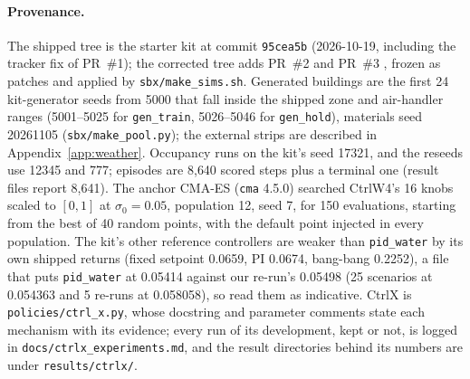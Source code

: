 \documentclass{article}
\newcommand{\cn}[1]{\texttt{#1}}
\begin{document}
\paragraph{Provenance.} The shipped tree is the starter kit at commit \texttt{95cea5b}
(2026-10-19, including the tracker fix of PR~\#1); the corrected tree adds PR~\#2 and PR~\#3
\citep{stncsn2026pr2,stncsn2026pr3}, frozen as patches and applied by \texttt{sbx/make\_sims.sh}.
Generated buildings are the first 24 kit-generator seeds from 5000 that fall inside the shipped
zone and air-handler ranges (5001--5025 for \cn{gen\_train}, 5026--5046 for \cn{gen\_hold}),
materials seed 20261105 (\texttt{sbx/make\_pool.py}); the external strips are described in
Appendix~\ref{app:weather}. Occupancy runs on the kit's seed 17321, and the reseeds use 12345 and
777; episodes are 8{,}640 scored steps plus a terminal one (result files report 8{,}641). The anchor CMA-ES (\texttt{cma} 4.5.0) searched CtrlW4's 16 knobs scaled to $[0,1]$ at
$\sigma_0=0.05$, population 12, seed 7, for 150 evaluations, starting from the best of 40 random
points, with the default point injected in every population. The kit's other reference
controllers are weaker than \cn{pid\_water} by its own shipped returns (fixed setpoint 0.0659,
PI 0.0674, bang-bang 0.2252), a file that puts \cn{pid\_water} at 0.05414 against our re-run's
0.05498 (25 scenarios at 0.054363 and 5 re-runs at 0.058058), so read them as indicative. CtrlX is \texttt{policies/ctrl\_x.py}, whose docstring
and parameter comments state each mechanism with its evidence; every run of its development,
kept or not, is logged in \texttt{docs/ctrlx\_experiments.md}, and the result directories behind
its numbers are under \texttt{results/ctrlx/}.
\end{document}
